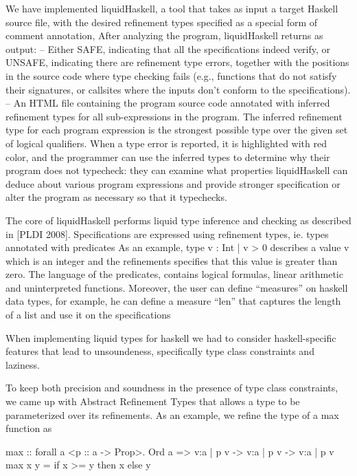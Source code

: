 


We have implemented liquidHaskell, a tool that takes as input
a target Haskell source file, with the desired refinement types specified as a special
form of comment annotation,
After analyzing the program, liquidHaskell returns as output:
-- Either SAFE, indicating that all the specifications indeed verify, or UNSAFE, indicating there are refinement type errors, together with the positions in the source
code where type checking fails (e.g., functions that do not satisfy their signatures,
or callsites where the inputs don't conform to the specifications).
-- An HTML file containing the program source code annotated with inferred refinement types for all sub-expressions in the program. The inferred refinement type for
each program expression is the strongest possible type over the given set of logical qualifiers. When a type error is reported,  it is highlighted with red color, and the programmer can use the inferred
types to determine why their program does not typecheck: they can examine what
properties liquidHaskell can deduce about various program expressions and 
provide stronger specification or alter the program as necessary so that it typechecks.

The core of liquidHaskell performs liquid type inference and checking as described in [PLDI 2008].
Specifications are expressed using refinement types, ie. types annotated with predicates
As an example, type {v : Int | v > 0} describes a value v which is an integer and the refinements specifies that this value is greater than zero.
The language of the predicates, contains logical formulas, linear arithmetic and uninterpreted functions. Moreover, the user can define ``measures'' on haskell data types, for example, he can define a measure ``len'' that captures the length of a list and use it on the specifications 


When implementing liquid types for haskell we had to consider haskell-specific features that lead to unsoundeness,
specifically type class constraints and laziness.

To keep both precision and soundness in the presence of type class constraints, 
we came up with Abstract Refinement Types that allows a type to be parameterized over its refinements.
As an example, we refine the type of a max function as

max :: forall a <p :: a -> Prop>. Ord a => {v:a | p v} -> {v:a | p v} -> {v:a | p v}
max x y = if x >= y then x else y

